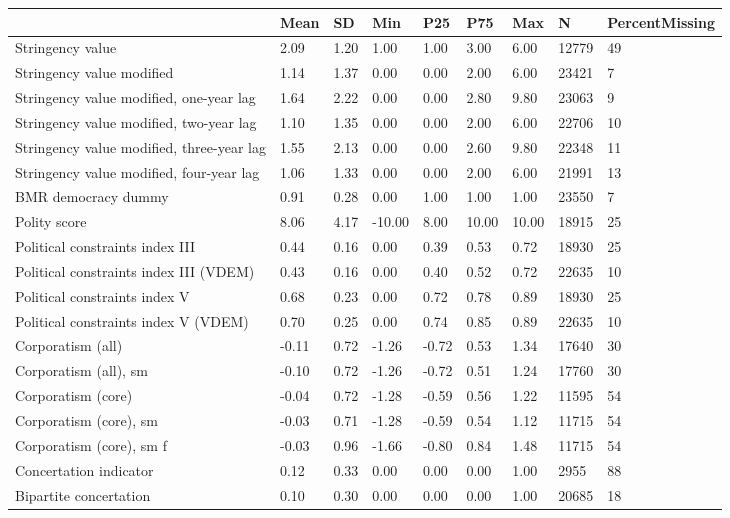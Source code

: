 
\begin{longtable}{lllllllll}
\toprule
  & Mean & SD & Min & P25 & P75 & Max & N & PercentMissing\\
\midrule
Stringency value & 2.09 & 1.20 & 1.00 & 1.00 & 3.00 & 6.00 & 12779 & 49\\
Stringency value modified & 1.14 & 1.37 & 0.00 & 0.00 & 2.00 & 6.00 & 23421 & 7\\
Stringency value modified, one-year lag & 1.64 & 2.22 & 0.00 & 0.00 & 2.80 & 9.80 & 23063 & 9\\
Stringency value modified, two-year lag & 1.10 & 1.35 & 0.00 & 0.00 & 2.00 & 6.00 & 22706 & 10\\
Stringency value modified, three-year lag & 1.55 & 2.13 & 0.00 & 0.00 & 2.60 & 9.80 & 22348 & 11\\
\addlinespace
Stringency value modified, four-year lag & 1.06 & 1.33 & 0.00 & 0.00 & 2.00 & 6.00 & 21991 & 13\\
BMR democracy dummy & 0.91 & 0.28 & 0.00 & 1.00 & 1.00 & 1.00 & 23550 & 7\\
Polity score & 8.06 & 4.17 & -10.00 & 8.00 & 10.00 & 10.00 & 18915 & 25\\
Political constraints index III & 0.44 & 0.16 & 0.00 & 0.39 & 0.53 & 0.72 & 18930 & 25\\
Political constraints index III (VDEM) & 0.43 & 0.16 & 0.00 & 0.40 & 0.52 & 0.72 & 22635 & 10\\
\addlinespace
Political constraints index V & 0.68 & 0.23 & 0.00 & 0.72 & 0.78 & 0.89 & 18930 & 25\\
Political constraints index V (VDEM) & 0.70 & 0.25 & 0.00 & 0.74 & 0.85 & 0.89 & 22635 & 10\\
Corporatism (all) & -0.11 & 0.72 & -1.26 & -0.72 & 0.53 & 1.34 & 17640 & 30\\
Corporatism (all), sm & -0.10 & 0.72 & -1.26 & -0.72 & 0.51 & 1.24 & 17760 & 30\\
Corporatism (core) & -0.04 & 0.72 & -1.28 & -0.59 & 0.56 & 1.22 & 11595 & 54\\
\addlinespace
Corporatism (core), sm & -0.03 & 0.71 & -1.28 & -0.59 & 0.54 & 1.12 & 11715 & 54\\
Corporatism (core), sm f & -0.03 & 0.96 & -1.66 & -0.80 & 0.84 & 1.48 & 11715 & 54\\
Concertation indicator & 0.12 & 0.33 & 0.00 & 0.00 & 0.00 & 1.00 & 2955 & 88\\
Bipartite concertation & 0.10 & 0.30 & 0.00 & 0.00 & 0.00 & 1.00 & 20685 & 18\\

\end{longtable}
